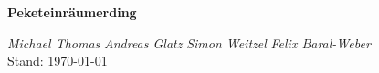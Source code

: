 \documentclass[a4paper, 12pt]{scrartcl}
\begin{document}
\begin{normalsize}

\raggedright\textbf{\Huge Peketeinräumerding}\\	
		\begin{flushright}
		\textit{Michael Thomas}
		\textit{Andreas Glatz}
		\textit{Simon Weitzel}
		\textit{Felix Baral-Weber}\\
		Stand: \space \today \space \thistime
		\end{flushright}

\end{normalsize}
\tableofcontents



%
\end{document}
